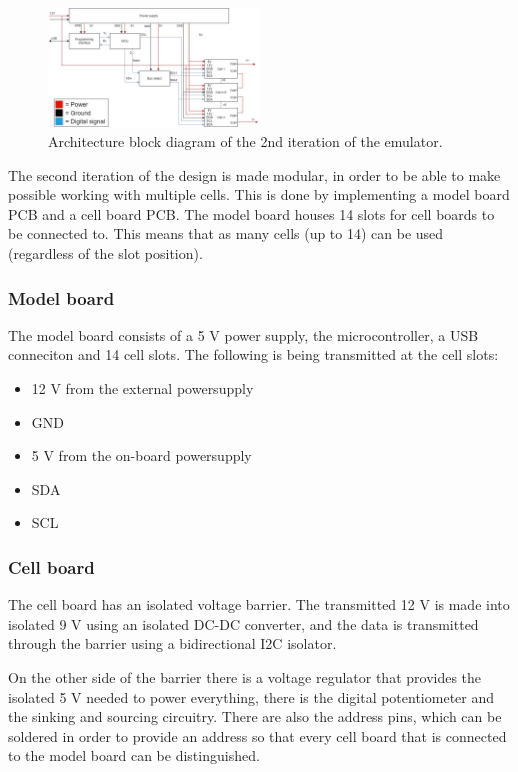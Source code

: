 \begin{figure}[h]
    \centering
    \includegraphics[width=0.5\textwidth]{architecture_2nd_iteration.png}
    \caption{Architecture block diagram of the 2nd iteration of the emulator.}
    \label{fig:2nd_architecture}
\end{figure}

The second iteration of the design is made modular, in order to be able to make 
possible working with multiple cells. This is done by implementing a model board
PCB and a cell board PCB. The model board houses 14 slots for cell boards to be 
connected to. This means that as many cells (up to 14) can be used (regardless 
of the slot position).

    \subsubsection{Model board}
    The model board consists of a 5 V power supply, the microcontroller, a USB 
    conneciton and 14 cell slots. The following is being transmitted at the
    cell slots:

    \begin{itemize}
        \item 12 V from the external powersupply
        \item GND
        \item 5 V from the on-board powersupply
        \item SDA
        \item SCL
    \end{itemize}

    \subsubsection{Cell board}
    The cell board has an isolated voltage barrier. The transmitted 12 V is 
    made into isolated 9 V using an isolated DC-DC converter, and the data is
    transmitted through the barrier using a bidirectional I2C isolator.

    On the other side of the barrier there is a voltage regulator that provides 
    the isolated 5 V needed to power everything, there is the digital potentiometer
    and the sinking and sourcing circuitry. There are also the address pins, which
    can be soldered in order to provide an address so that every cell board that 
    is connected to the model board can be distinguished. 


